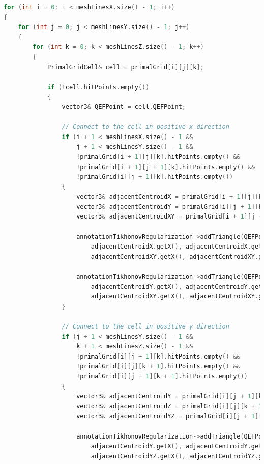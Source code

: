 \vspace{2mm}
\begin{lstlisting}[language=C++, caption=Mesh Generation Using QEF Points, label=lst:meshGeneration]
for (int i = 0; i < meshLinesX.size() - 1; i++)
{
	for (int j = 0; j < meshLinesY.size() - 1; j++)
	{
		for (int k = 0; k < meshLinesZ.size() - 1; k++)
		{
			PrimalGridCell& cell = primalGrid[i][j][k];

			if (!cell.hitPoints.empty())
			{
				vector3& QEFPoint = cell.QEFPoint;

				// Connect to the cell in positive x direction
				if (i + 1 < meshLinesX.size() - 1 &&
					j + 1 < meshLinesY.size() - 1 &&
					!primalGrid[i + 1][j][k].hitPoints.empty() &&
					!primalGrid[i + 1][j + 1][k].hitPoints.empty() &&
					!primalGrid[i][j + 1][k].hitPoints.empty())
				{
					vector3& adjacentCentroidX = primalGrid[i + 1][j][k].QEFPoint;
					vector3& adjacentCentroidY = primalGrid[i][j + 1][k].QEFPoint;
					vector3& adjacentCentroidXY = primalGrid[i + 1][j + 1][k].QEFPoint;

					annotationTikhonovRegularization->addTriangle(QEFPoint.getX(), QEFPoint.getY(), QEFPoint.getZ(),
						adjacentCentroidX.getX(), adjacentCentroidX.getY(), adjacentCentroidX.getZ(),
						adjacentCentroidXY.getX(), adjacentCentroidXY.getY(), adjacentCentroidXY.getZ(), 0.0, 0.0, 0.6);

					annotationTikhonovRegularization->addTriangle(QEFPoint.getX(), QEFPoint.getY(), QEFPoint.getZ(),
						adjacentCentroidY.getX(), adjacentCentroidY.getY(), adjacentCentroidY.getZ(),
						adjacentCentroidXY.getX(), adjacentCentroidXY.getY(), adjacentCentroidXY.getZ(), 0.0, 0.0, 0.6);
				}

				// Connect to the cell in positive y direction
				if (j + 1 < meshLinesY.size() - 1 &&
					k + 1 < meshLinesZ.size() - 1 &&
					!primalGrid[i][j + 1][k].hitPoints.empty() &&
					!primalGrid[i][j][k + 1].hitPoints.empty() &&
					!primalGrid[i][j + 1][k + 1].hitPoints.empty())
				{
					vector3& adjacentCentroidY = primalGrid[i][j + 1][k].QEFPoint;
					vector3& adjacentCentroidZ = primalGrid[i][j][k + 1].QEFPoint;
					vector3& adjacentCentroidYZ = primalGrid[i][j + 1][k + 1].QEFPoint;

					annotationTikhonovRegularization->addTriangle(QEFPoint.getX(), QEFPoint.getY(), QEFPoint.getZ(),
						adjacentCentroidY.getX(), adjacentCentroidY.getY(), adjacentCentroidY.getZ(),
						adjacentCentroidYZ.getX(), adjacentCentroidYZ.getY(), adjacentCentroidYZ.getZ(), 0.0, 0.0, 0.6);


\end{lstlisting}
